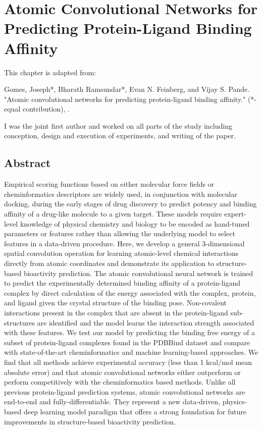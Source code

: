 \section{Atomic Convolutional Networks for Predicting Protein-Ligand Binding Affinity}

This chapter is adapted from: 

Gomes, Joseph*, Bharath Ramsundar*, Evan N. Feinberg, and Vijay S. Pande. "Atomic convolutional networks for predicting protein-ligand binding affinity." (*-equal contribution), \cite{gomes2017atomic}. 


I was the joint first author and worked on all parts of the study including conception, design and execution of experiments, and writing of the paper.


\subsection{Abstract}
Empirical scoring functions based on either molecular force fields or cheminformatics descriptors are widely used, in conjunction with molecular docking, during the early stages of drug discovery to predict potency and binding affinity of a drug-like molecule to a given target.  These models require expert-level knowledge of physical chemistry and biology to be encoded as hand-tuned parameters or features rather than allowing the underlying model to select features in a data-driven procedure.  Here, we develop a general 3-dimensional spatial convolution operation for learning atomic-level chemical interactions directly from atomic coordinates and demonstrate its application to structure-based bioactivity prediction.  The atomic convolutional neural network is trained to predict the experimentally determined binding affinity of a protein-ligand complex by direct calculation of the energy associated with the complex, protein, and ligand given the crystal structure of the binding pose. Non-covalent interactions present in the complex that are absent in the protein-ligand sub-structures are identified and the model learns the interaction strength associated with these features. We test our model by predicting the binding free energy of a subset of protein-ligand complexes found in the PDBBind dataset and compare with state-of-the-art cheminformatics and machine learning-based approaches.  We find that all methods achieve experimental accuracy (less than 1 kcal/mol mean absolute error) and that atomic convolutional networks either outperform or perform competitively with the cheminformatics based methods. Unlike all previous protein-ligand prediction systems, atomic convolutional networks are end-to-end and fully-differentiable.  They represent a new data-driven, physics-based deep learning model paradigm that offers a strong foundation for future improvements in structure-based bioactivity prediction. 

